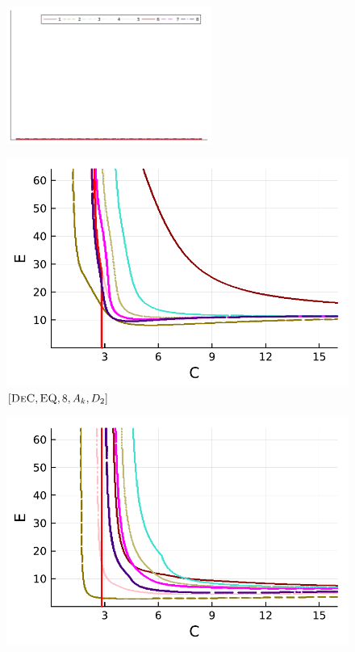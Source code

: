 \begin{figure}[!h]
	\centering
	\includegraphics[width=0.6\textwidth,trim={100 340 30 22}, clip]{pdf/pdepics/legends/colors_a-d_new_horiz_1-8_no_order.pdf}\\
	\begin{minipage}[t]{0.32\textwidth}
		\includegraphics[width=\textwidth]{pdf/pdepics/diff/IMEXDeC_equispaced_adv_ord_1-8.pdf}
		\centering
		$[\textsc{DeC},\textsc{EQ},8, A_k,D_2]$
	\end{minipage} 
	\begin{minipage}[t]{0.32\textwidth}
		\includegraphics[width=\textwidth]{pdf/pdepics/diff/IMEXDeC_subtimesteps_equispaced_adv_ord_1-8.pdf}

\end{minipage}
\end{figure}
